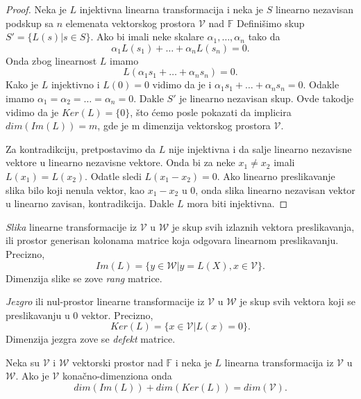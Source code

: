 \documentclass{article}
\begin{document}
\begin{proof}
  Neka je $L$ injektivna linearna transformacija i neka je $S$ linearno nezavisan podskup sa $n$ elemenata vektorskog prostora $\mathcal{V}$ nad $\mathbb{F}$
  Definišimo skup $S' = \{L(s) | s \in S\}$.
  Ako bi imali neke skalare $\alpha_1, \ldots,\alpha_n$ tako da
  \[\alpha_1 L(s_1) + \ldots + \alpha_n L(s_n) = 0.\]
  Onda zbog linearnost $L$ imamo
  \[L(\alpha_1 s_1 + \ldots + \alpha_n s_n) = 0.\]
  Kako je $L$ injektivno i $L(0) = 0$ vidimo da je i $\alpha_1 s_1 + \ldots + \alpha_n s_n = 0$.
  Odakle imamo $\alpha_1 = \alpha_2 = \ldots = \alpha_n = 0$.
  Dakle $S'$ je linearno nezavisan skup.
  Ovde takodje vidimo da je $Ker(L) = \{0\}$, što ćemo posle pokazati da implicira $dim(Im(L)) = m$, gde je m dimenzija vektorskog prostora $\mathcal{V}$.


  Za kontradikciju, pretpostavimo da $L$ nije injektivna i da salje linearno nezavisne vektore u linearno nezavisne vektore.
  Onda bi za neke $x_1 \neq x_2$ imali $L(x_1) = L(x_2)$.
  Odatle sledi $L(x_1 - x_2) = 0$.
  Ako linearno preslikavanje slika bilo koji nenula vektor, kao $x_1 - x_2$ u $0$, onda slika linearno nezavisan vektor u linearno zavisan, kontradikcija.
  Dakle $L$ mora biti injektivna.
\end{proof}

\begin{definition}[Slika]
  \textit{Slika} linearne transformacije iz $\mathcal{V}$ u $\mathcal{W}$ je skup svih izlaznih vektora preslikavanja, ili prostor generisan kolonama matrice koja odgovara linearnom preslikavanju.
  Precizno, 
  \[Im(L) = \{y \in \mathcal{W} | y = L(X), x \in \mathcal{V}\}.\]
  Dimenzija slike se zove \textit{rang} matrice.
\end{definition}

\begin{definition}[Jezgro]
  \textit{Jezgro} ili nul-prostor linearne transformacije iz $\mathcal{V}$ u $\mathcal{W}$ je skup svih vektora koji se preslikavanju u $0$ vektor.
  Precizno, 
  \[Ker(L) = \{x \in \mathcal{V} | L(x) = 0\}.\]
  Dimenzija jezgra zove se \textit{defekt} matrice.
\end{definition}

\begin{theorem}
  Neka su $\mathcal{V}$ i $\mathcal{W}$ vektorski prostor nad $\mathbb{F}$ i neka je $L$ linearna transformacija iz $\mathcal{V}$ u $\mathcal{W}$.
  Ako je $\mathcal{V}$ konačno-dimenziona onda
  \[dim(Im(L)) + dim(Ker(L)) = dim(\mathcal{V}).\]
\end{theorem}
\end{document}

